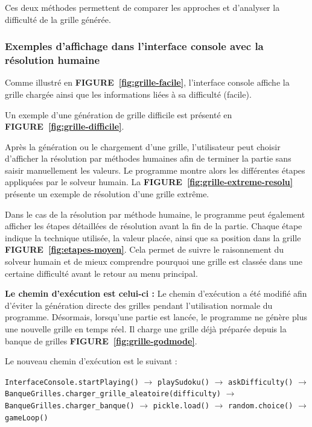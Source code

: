 \documentclass[a4paper]{article}
\begin{document}
Ces deux méthodes permettent de comparer les approches et d’analyser la difficulté de la grille générée. 

\subsubsection{Exemples d'affichage dans l'interface console avec la résolution humaine}

Comme illustré en \textbf{FIGURE~\ref{fig:grille-facile}}, l'interface console affiche la grille chargée ainsi que les informations liées à sa difficulté (facile).

Un exemple d'une génération de grille difficile est présenté en \textbf{FIGURE~\ref{fig:grille-difficile}}.

Après la génération ou le chargement d'une grille, l'utilisateur peut choisir d'afficher la résolution par méthodes humaines afin de terminer la partie sans saisir manuellement les valeurs. 
Le programme montre alors les différentes étapes appliquées par le solveur humain. 
La \textbf{FIGURE~\ref{fig:grille-extreme-resolu}} présente un exemple de résolution d'une grille extrême.


Dans le cas de la résolution par méthode humaine, le programme peut également afficher les étapes détaillées de résolution avant la fin de la partie. 
Chaque étape indique la technique utilisée, la valeur placée, ainsi que sa position dans la grille \textbf{FIGURE~\ref{fig:etapes-moyen}}. 
Cela permet de suivre le raisonnement du solveur humain et de mieux comprendre pourquoi une grille est classée dans une certaine difficulté avant le retour au menu principal.


\textbf{Le chemin d’exécution est celui-ci :}
Le chemin d'exécution a été modifié afin d'éviter la génération directe des grilles pendant l'utilisation normale du programme. 
Désormais, lorsqu'une partie est lancée, le programme ne génère plus une nouvelle grille en temps réel. 
Il charge une grille déjà préparée depuis la banque de grilles \textbf{FIGURE~\ref{fig:grille-godmode}}.

Le nouveau chemin d'exécution est le suivant :

\begin{center}
\texttt{InterfaceConsole.startPlaying()} 
$\rightarrow$ \texttt{playSudoku()} 
$\rightarrow$ \texttt{askDifficulty()} 
$\rightarrow$ \texttt{BanqueGrilles.charger\_grille\_aleatoire(difficulty)}
$\rightarrow$ \texttt{BanqueGrilles.charger\_banque()}
$\rightarrow$ \texttt{pickle.load()}
$\rightarrow$ \texttt{random.choice()}
$\rightarrow$ \texttt{gameLoop()}
\end{center}
\end{document}
